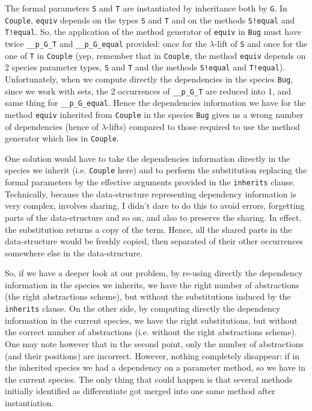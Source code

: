 The formal parameters {\tt S} and {\tt T} are instantiated by
inheritance both by {\tt G}. In {\tt Couple}, {\tt equiv} depends on
the types {\tt S} and {\tt T} and on the methods {\tt S!equal} and
{\tt T!equal}. So, the application of the method generator
of {\tt equiv} in {\tt Bug} must have twice {\tt \_\_p\_G\_T} and
{\tt \_\_p\_G\_equal} provided: once for the $\lambda$-lift of {\tt S}
and once for the one of {\tt T} in {\tt Couple} (yep, remember that in
{\tt Couple}, the method {\tt equiv} depends on 2 species parameter
types, {\tt S} and {\tt T} and the methods {\tt S!equal} and
{\tt T!equal}). Unfortunately, when we compute directly the
dependencies in the species {\tt Bug}, since we work with sets, the 2
occurrences of {\tt \_\_p\_G\_T} are reduced into 1, and same thing
for {\tt \_\_p\_G\_equal}. Hence the dependencies information we have
for the method {\tt equiv} inherited from {\tt Couple} in the species
{\tt Bug} gives  us a wrong number of dependencies (hence of
$\lambda$-lifts) compared to those required to use the method
generator which lies in {\tt Couple}.

\medskip
One solution would have to take the dependencies information directly
in the species we inherit (i.e. {\tt Couple} here) and to perform the
substitution replacing the formal parameters by the effective
arguments provided in the {\tt inherits} clause. Technically, because
the data-structure representing dependency information is very
complex, involves sharing, I didn't dare to do this to avoid errors,
forgetting parts of the data-structure and so on, and also to preserve
the sharing. In effect, the substitution returns a copy of the
term. Hence, all the shared parts in the data-structure would be
freshly copied, then separated of their other occurrences somewhere
else in the data-structure.

\medskip
So, if we have a deeper look at our problem, by re-using directly the
dependency information in the species we inherits, we have the right
number of abstractions (the right abstractions scheme), but without
the substitutions induced by the {\tt inherits} clause. On the other
side, by computing directly the dependency information in the current
species, we have the right substitutions, but without the correct
number of abstractions (i.e. without the right abstractions
scheme). One may note however that in the second point, only the
number of abstractions  (and their positions) are incorrect. However,
nothing completely disappear: if in the inherited species we had a
dependency on a parameter method, so we have in the current
species. The only thing that could happen is that several methods
initially identified as differentiate got merged into one same method
after instantiation.

